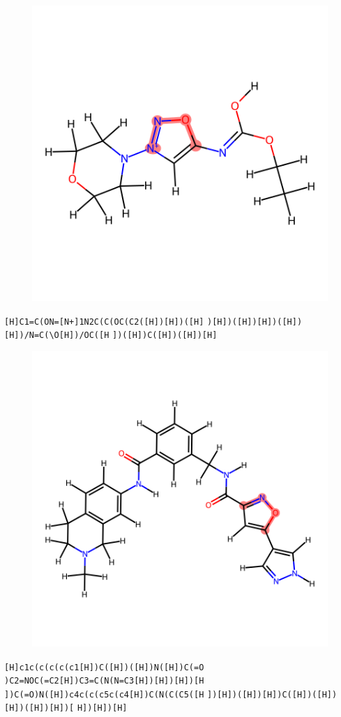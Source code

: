 \documentclass{article}
\begin{document}
\begin{figure}[ht]
\centering
    \includegraphics{mol92.png}
\end{figure}
\verb|[H]C1=C(ON=[N+]1N2C(C(OC(C2([H])[H])([H]| \verb|)[H])([H])[H])([H])[H])/N=C(\O[H])/OC([H| \verb|])([H])C([H])([H])[H]|

\begin{figure}[ht]
\centering
    \includegraphics{mol93.png}
\end{figure}
\verb|[H]c1c(c(c(c(c1[H])C([H])([H])N([H])C(=O| \verb|)C2=NOC(=C2[H])C3=C(N(N=C3[H])[H])[H])[H| \verb|])C(=O)N([H])c4c(c(c5c(c4[H])C(N(C(C5([H| \verb|])[H])([H])[H])C([H])([H])[H])([H])[H])[| \verb|H])[H])[H]|
\end{document}
